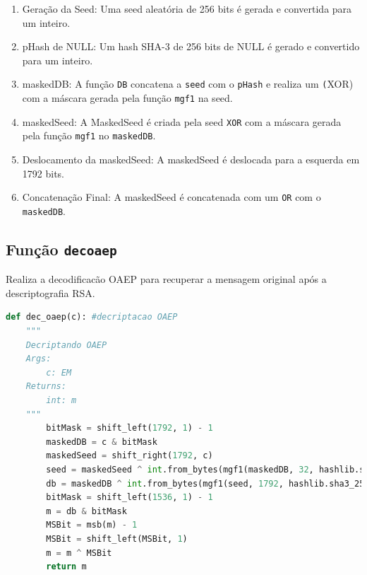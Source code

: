 \documentclass{article}
\begin{document}
    \begin{enumerate}
        \item Geração da Seed: Uma seed aleatória de 256 bits é gerada e convertida para um inteiro.
        \item pHash de NULL: Um hash SHA-3 de 256 bits de NULL é gerado e convertido para um inteiro.
        \item maskedDB: A função \texttt{DB} concatena a \texttt{seed} com o \texttt{pHash} e realiza um \texttt(XOR)
         com a máscara gerada pela função \texttt{mgf1} na seed.
        \item maskedSeed: A MaskedSeed é criada pela seed \texttt{XOR} com a máscara gerada pela função \texttt{mgf1} no \texttt{maskedDB}.
        \item Deslocamento da maskedSeed: A maskedSeed é deslocada para a esquerda em 1792 bits.
        \item Concatenação Final: A maskedSeed é concatenada com um \texttt{OR} com o \texttt{maskedDB}.
    \end{enumerate}

\subsection{Função \texttt{dec\textunderscore oaep}}
Realiza a decodificacão OAEP para recuperar a mensagem original após a descriptografia RSA.

\begin{lstlisting}[language=Python]
    def dec_oaep(c): #decriptacao OAEP
    """
    Decriptando OAEP
    Args:
        c: EM
    Returns:
        int: m
    """
        bitMask = shift_left(1792, 1) - 1                                                           # mascara de bits
        maskedDB = c & bitMask
        maskedSeed = shift_right(1792, c)                                                                      # mascara de DB
        seed = maskedSeed ^ int.from_bytes(mgf1(maskedDB, 32, hashlib.sha3_256), byteorder='big')   #
        db = maskedDB ^ int.from_bytes(mgf1(seed, 1792, hashlib.sha3_256), byteorder='big')         #      
        bitMask = shift_left(1536, 1) - 1                                                           #
        m = db & bitMask                                                                            #
        MSBit = msb(m) - 1                                                                          #
        MSBit = shift_left(MSBit, 1)                                                                #
        m = m ^ MSBit                                                                               #
        return m
    \end{lstlisting}
    
\end{document}
